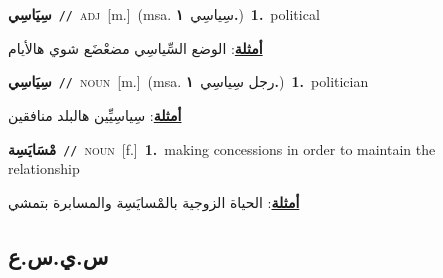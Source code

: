 \documentclass[10pt,a4paper,twoside]{article} %
\begin{document}
\begin{multicols}{2}
{\setlength\topsep{0pt}\textbf{\foreignlanguage{arabic}{سِيَاسِي}}\ {\color{gray}\texttt{//}\color{black}}\ \textsc{adj}\ [m.]\ \color{gray}(msa. \foreignlanguage{arabic}{سِياسِي}~\foreignlanguage{arabic}{\textbf{١.}})\color{black}\ \textbf{1.}~political\  \begin{flushright}\color{gray}\foreignlanguage{arabic}{\textbf{\underline{\foreignlanguage{arabic}{أمثلة}}}: الوضع السِّياسِي مضعْضَع شوي هالأيام}\end{flushright}\color{black}} \vspace{2mm}

{\setlength\topsep{0pt}\textbf{\foreignlanguage{arabic}{سِيَاسِي}}\ {\color{gray}\texttt{//}\color{black}}\ \textsc{noun}\ [m.]\ \color{gray}(msa. \foreignlanguage{arabic}{رجل سِياسِي}~\foreignlanguage{arabic}{\textbf{١.}})\color{black}\ \textbf{1.}~politician\  \begin{flushright}\color{gray}\foreignlanguage{arabic}{\textbf{\underline{\foreignlanguage{arabic}{أمثلة}}}: سِياسِيِّين هالبلد منافقين}\end{flushright}\color{black}} \vspace{2mm}

{\setlength\topsep{0pt}\textbf{\foreignlanguage{arabic}{مْسَايَسِة}}\ {\color{gray}\texttt{//}\color{black}}\ \textsc{noun}\ [f.]\ \textbf{1.}~making concessions in order to maintain the relationship\  \begin{flushright}\color{gray}\foreignlanguage{arabic}{\textbf{\underline{\foreignlanguage{arabic}{أمثلة}}}: الحياة الزوجية بالمْسايَسِة والمسابرة بتمشي}\end{flushright}\color{black}} \vspace{2mm}

\vspace{-3mm}
\subsection*{\color{blue}\foreignlanguage{arabic}{س.ي.س.ع}\color{blue}{ (ntws)}} 


\end{multicols}
\end{document}

